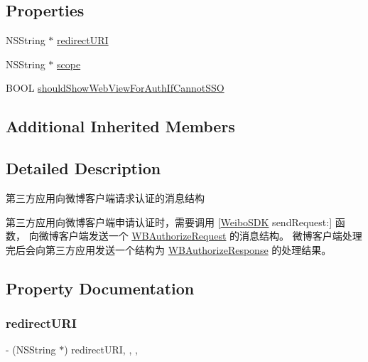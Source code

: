 \subsection*{Properties}
\begin{DoxyCompactItemize}
\item 
N\+S\+String $\ast$ \mbox{\hyperlink{interface_w_b_authorize_request_af78c65c3705d69633b5f4f666b321ff8}{redirect\+U\+RI}}
\item 
N\+S\+String $\ast$ \mbox{\hyperlink{interface_w_b_authorize_request_a2bfe28e6d4731a1e64d12d94bde02d79}{scope}}
\item 
B\+O\+OL \mbox{\hyperlink{interface_w_b_authorize_request_a3af1f52acf762efc303adbabb55cee4d}{should\+Show\+Web\+View\+For\+Auth\+If\+Cannot\+S\+SO}}
\end{DoxyCompactItemize}
\subsection*{Additional Inherited Members}


\subsection{Detailed Description}
第三方应用向微博客户端请求认证的消息结构

第三方应用向微博客户端申请认证时，需要调用 \mbox{[}\mbox{\hyperlink{interface_weibo_s_d_k}{Weibo\+S\+DK}} send\+Request\+:\mbox{]} 函数， 向微博客户端发送一个 \mbox{\hyperlink{interface_w_b_authorize_request}{W\+B\+Authorize\+Request}} 的消息结构。 微博客户端处理完后会向第三方应用发送一个结构为 \mbox{\hyperlink{interface_w_b_authorize_response}{W\+B\+Authorize\+Response}} 的处理结果。 

\subsection{Property Documentation}
\mbox{\label{interface_w_b_authorize_request_af78c65c3705d69633b5f4f666b321ff8}} 
\subsubsection{\texorpdfstring{redirect\+U\+RI}{redirectURI}}
{\footnotesize\ttfamily -\/ (N\+S\+String $\ast$) redirect\+U\+RI\hspace{0.3cm}{\ttfamily [read]}, {\ttfamily [write]}, {\ttfamily [nonatomic]}, {\ttfamily [strong]}}

